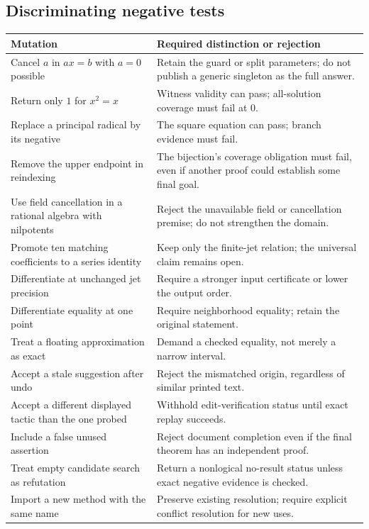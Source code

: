 \documentclass[11pt,letterpaper]{article}
\theoremstyle{definition}
\begin{document}
\subsection{Discriminating negative tests}
\begin{longtable}{@{}P{.37\textwidth}P{.56\textwidth}@{}}
\toprule
Mutation & Required distinction or rejection \\
\midrule
\endhead
Cancel \(a\) in \(ax=b\) with \(a=0\) possible & Retain the guard or split parameters;
do not publish a generic singleton as the full answer.\\
Return only \(1\) for \(x^2=x\) & Witness validity can pass; all-solution coverage
must fail at \(0\).\\
Replace a principal radical by its negative & The square equation can pass;
branch evidence must fail.\\
Remove the upper endpoint in reindexing & The bijection's coverage obligation
must fail, even if another proof could establish some final goal.\\
Use field cancellation in a rational algebra with nilpotents & Reject the
unavailable field or cancellation premise; do not strengthen the domain.\\
Promote ten matching coefficients to a series identity & Keep only the finite-jet
relation; the universal claim remains open.\\
Differentiate at unchanged jet precision & Require a stronger input certificate
or lower the output order.\\
Differentiate equality at one point & Require neighborhood equality; retain the
original statement.\\
Treat a floating approximation as exact & Demand a checked equality, not merely
a narrow interval.\\
Accept a stale suggestion after undo & Reject the mismatched origin, regardless
of similar printed text.\\
Accept a different displayed tactic than the one probed & Withhold edit-verification
status until exact replay succeeds.\\
Include a false unused assertion & Reject document completion even if the final
theorem has an independent proof.\\
Treat empty candidate search as refutation & Return a nonlogical no-result status
unless exact negative evidence is checked.\\
Import a new method with the same name & Preserve existing resolution; require
explicit conflict resolution for new uses.\\
\bottomrule
\end{longtable}
\end{document}
